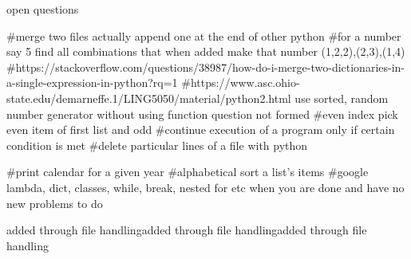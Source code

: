 open questions

#merge two files actually append one at the end of other python
#for a number say 5 find all combinations that when added make that number (1,2,2),(2,3),(1,4)
#https://stackoverflow.com/questions/38987/how-do-i-merge-two-dictionaries-in-a-single-expression-in-python?rq=1
#https://www.asc.ohio-state.edu/demarneffe.1/LING5050/material/python2.html
use sorted, random number generator without using function
question not formed #even index pick even item of first list and odd 
#continue execution of a program only if certain condition is met
#delete particular lines of a file with python

#print calendar for a given year 
#alphabetical sort a list's items
#google lambda, dict, classes, while, break, nested for etc  when you are done and have no new problems to do


added through file handlingadded through file handlingadded through file handling
